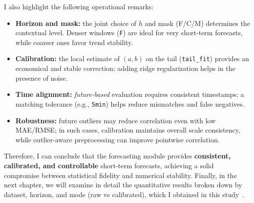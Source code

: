 \medskip
\noindent I also highlight the following operational remarks:
\begin{itemize}
  \item \textbf{Horizon and mask:} the joint choice of $h$ and mask (F/C/M) determines the contextual level. Denser windows (\texttt{F}) are ideal for very short-term forecasts, while coarser ones favor trend stability.
  \item \textbf{Calibration:} the local estimate of $(a,b)$ on the tail (\texttt{tail\_fit}) provides an economical and stable correction; adding ridge regularization helps in the presence of noise.
  \item \textbf{Time alignment:} \emph{future-based} evaluation requires consistent timestamps; a matching tolerance (e.g., \texttt{5min}) helps reduce mismatches and false negatives.
  \item \textbf{Robustness:} future outliers may reduce correlation even with low MAE/RMSE; in such cases, calibration maintains overall scale consistency, while outlier-aware preprocessing can improve pointwise correlation.
\end{itemize}

Therefore, I can conclude that the forecasting module provides \textbf{consistent, calibrated, and controllable} short-term forecasts, achieving a solid compromise between statistical fidelity and numerical stability.  
Finally, in the next chapter, we will examine in detail the quantitative results broken down by dataset, horizon, and mode (raw vs calibrated), which I obtained in this study~\cite{hastie2009elements,shumway2017time,aggarwal2015data}.